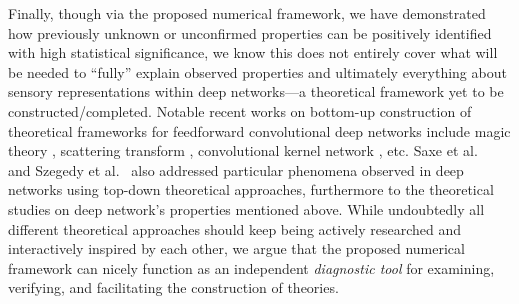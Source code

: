 Finally, though via the proposed numerical framework, we have demonstrated how previously unknown or unconfirmed properties can be positively identified with high statistical significance, we know this does not entirely cover what will be needed to ``fully'' explain observed properties and ultimately everything about sensory representations within deep networks---a theoretical framework yet to be constructed/completed. Notable recent works on bottom-up construction of theoretical frameworks for feedforward convolutional deep networks include magic theory \cite{anselmi2013unsupervised}, scattering transform \cite{mallat2012group}, convolutional kernel network \cite{MairalKHS14}, etc. Saxe et al.~\cite{saxe2011random} and Szegedy et al.~\cite{szegedy2013intriguing} also addressed particular phenomena observed in deep networks using top-down theoretical approaches, furthermore to the theoretical studies \cite{delalleau2011shallow, montufar2014number} on deep network's properties mentioned above. While undoubtedly all different theoretical approaches should keep being actively researched and interactively inspired by each other, we argue that the proposed numerical framework can nicely function as an independent \emph{diagnostic tool} for examining, verifying, and facilitating the construction of theories.

